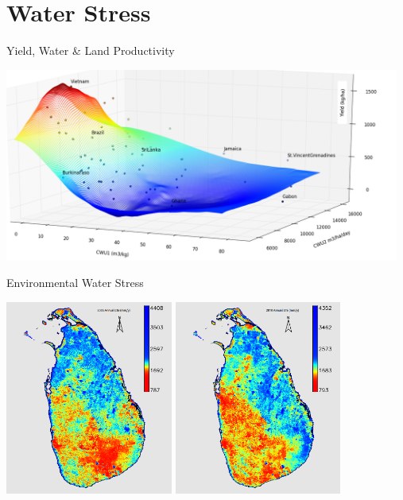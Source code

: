 \documentclass[xcolor=dvipsnames,beamer]{beamer} %
\begin{document}
\section{Water Stress}
\begin{frame}[fragile]{Yield, Water \& Land Productivity}

\begin{flushleft}
\includegraphics[width=13cm]{3d}
\end{flushleft}

\end{frame}

\begin{frame}[fragile]{Environmental Water Stress}

\begin{flushleft}
\includegraphics[width=5.5cm]{slet2005} \includegraphics[width=5.5cm]{slet2010} 
\end{flushleft}

\end{frame}
\end{document}
